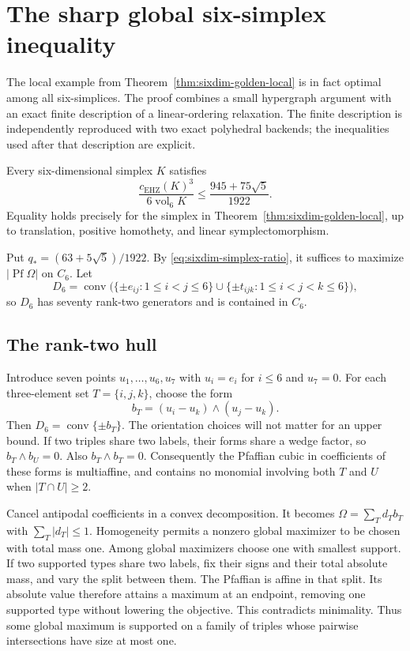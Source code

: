 \section{The sharp global six-simplex inequality}
\label{sec:sixdim-global}

The local example from Theorem~\ref{thm:sixdim-golden-local} is in fact
optimal among all six-simplices. The proof combines a small hypergraph
argument with an exact finite description of a linear-ordering relaxation.
The finite description is independently reproduced with two exact polyhedral
backends; the inequalities used after that description are explicit.

\begin{theorem}\label{thm:sixdim-global}
Every six-dimensional simplex $K$ satisfies
\[
 \frac{c_{\mathrm{EHZ}}(K)^3}{6\operatorname{vol}_6K}
 \le \frac{945+75\sqrt5}{1922}.
\]
Equality holds precisely for the simplex in
Theorem~\ref{thm:sixdim-golden-local}, up to translation, positive homothety,
and linear symplectomorphism.
\end{theorem}

Put $q_*=(63+5\sqrt5)/1922$. By
\eqref{eq:sixdim-simplex-ratio}, it suffices to maximize
$|\operatorname{Pf}\Omega|$ on $C_6$. Let
\[
 D_6=\operatorname{conv}\bigl(\{\pm e_{ij}:1\le i<j\le6\}
       \cup\{\pm t_{ijk}:1\le i<j<k\le6\}\bigr),
\]
so $D_6$ has
seventy rank-two generators and is contained in $C_6$.

\subsection{The rank-two hull}

Introduce seven points $u_1,\ldots,u_6,u_7$ with $u_i=e_i$ for $i\le6$
and $u_7=0$. For each three-element set $T=\{i,j,k\}$, choose the form
\[
 b_T=(u_i-u_k)\wedge(u_j-u_k).
\]
Then $D_6=\operatorname{conv}\{\pm b_T\}$. The orientation choices will
not matter for an upper bound. If two triples share two labels, their forms
share a wedge factor, so $b_T\wedge b_U=0$. Also $b_T\wedge b_T=0$.
Consequently the Pfaffian cubic in coefficients of these forms is
multiaffine, and contains no monomial involving both $T$ and $U$ when
$|T\cap U|\ge2$.

Cancel antipodal coefficients in a convex decomposition. It becomes
$\Omega=\sum_Td_Tb_T$ with $\sum_T|d_T|\le1$. Homogeneity permits a
nonzero global maximizer to be chosen with total mass one. Among global
maximizers choose one with smallest support. If two supported types share
two labels, fix their signs and their total absolute mass, and vary the
split between them. The Pfaffian is affine in that split. Its absolute
value therefore attains a maximum at an endpoint, removing one supported
type without lowering the objective. This contradicts minimality. Thus
some global maximum is supported on a family of triples whose pairwise
intersections have size at most one.

